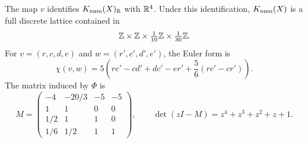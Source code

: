 \begin{lemma}\label{lem:numerical}
The map $v$ identifies $K_{\mathrm{num}}(X)_{\mathbb R}$ with $\mathbb R^4$. Under this
identification, $K_{\mathrm{num}}(X)$ is a full discrete lattice contained in
\begin{equation}\label{eq:numerical-lattice}
 \mathbb Z\times\mathbb Z\times\tfrac1{10}\mathbb Z\times\tfrac1{30}\mathbb Z.
\end{equation}
For $v=(r,c,d,e)$ and $w=(r',c',d',e')$, the Euler form is
\begin{equation}\label{eq:euler-form}
 \chi(v,w)=5\left(re'-cd'+dc'-er'
                   +\frac56(rc'-cr')\right).
\end{equation}
The matrix induced by $\Phi$ is
\begin{equation}\label{eq:numerical-rotation}
 M=
 \begin{pmatrix}
 -4&-20/3&-5&-5\\
 1&1&0&0\\
 1/2&1&1&0\\
 1/6&1/2&1&1
 \end{pmatrix},
 \qquad
 \det(zI-M)=z^4+z^3+z^2+z+1.
\end{equation}
\end{lemma}

